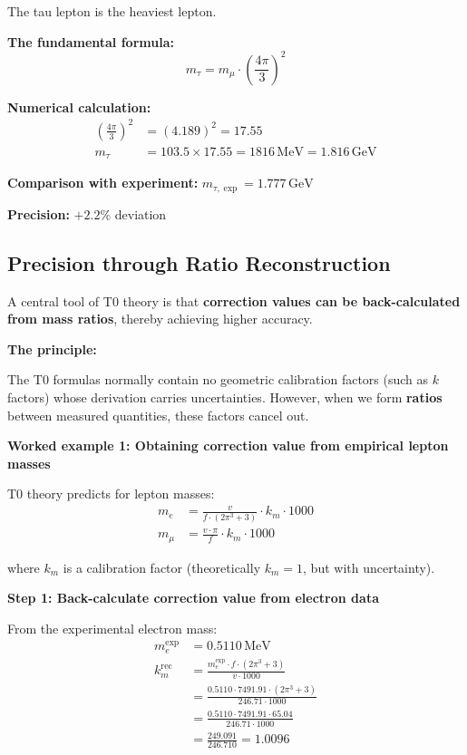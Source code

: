 	The tau lepton is the heaviest lepton.
	
	\textbf{The fundamental formula:}
	\begin{equation}
		\boxed{m_\tau = m_\mu \cdot \left(\frac{4\pi}{3}\right)^2}
	\end{equation}
	
	\textbf{Numerical calculation:}
	\begin{align}
		\left(\frac{4\pi}{3}\right)^2 &= (4.189)^2 = 17.55 \\
		m_\tau &= 103.5 \times 17.55 = 1816\,\text{MeV} = 1.816\,\text{GeV}
	\end{align}
	
	\textbf{Comparison with experiment:} \(m_{\tau,\exp} = 1.777\,\text{GeV}\)
	
	\textbf{Precision:} \(+2.2\%\) deviation
	
	\subsection{Precision through Ratio Reconstruction}
	
	A central tool of T0 theory is that \textbf{correction values can be back-calculated from mass ratios}, thereby achieving higher accuracy.
	
	\textbf{The principle:}
	
	The T0 formulas normally contain no geometric calibration factors (such as \(k\) factors) whose derivation carries uncertainties. However, when we form \textbf{ratios} between measured quantities, these factors cancel out.
	
	\textbf{Worked example 1: Obtaining correction value from empirical lepton masses}
	
	T0 theory predicts for lepton masses:
	\begin{align}
		m_e &= \frac{v}{f \cdot (2\pi^3 + 3)} \cdot k_m \cdot 1000 \\
		m_\mu &= \frac{v \cdot \pi}{f} \cdot k_m \cdot 1000
	\end{align}
	
	where \(k_m\) is a calibration factor (theoretically \(k_m = 1\), but with uncertainty).
	
	\textbf{Step 1: Back-calculate correction value from electron data}
	
	From the experimental electron mass:
	\begin{align}
		m_e^{\exp} &= 0.5110\,\text{MeV} \\
		k_m^{\text{rec}} &= \frac{m_e^{\exp} \cdot f \cdot (2\pi^3 + 3)}{v \cdot 1000} \\
		&= \frac{0.5110 \cdot 7491.91 \cdot (2\pi^3 + 3)}{246.71 \cdot 1000} \\
		&= \frac{0.5110 \cdot 7491.91 \cdot 65.04}{246.71 \cdot 1000} \\
		&= \frac{249.091}{246.710} = 1.0096
	\end{align}
	
